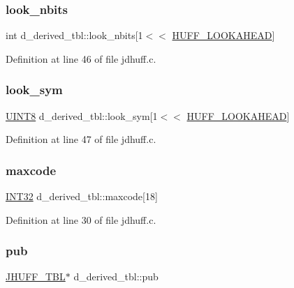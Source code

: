 \subsubsection{\texorpdfstring{look\_nbits}{look\_nbits}}
{\footnotesize\ttfamily int d\+\_\+derived\+\_\+tbl\+::look\+\_\+nbits\mbox{[}1$<$$<$ \mbox{\hyperlink{jdhuff_8c_a51937b71b3fbef28d57cc49f69ec8e7d}{H\+U\+F\+F\+\_\+\+L\+O\+O\+K\+A\+H\+E\+AD}}\mbox{]}}



Definition at line 46 of file jdhuff.\+c.

\mbox{\label{structd__derived__tbl_a526051256461864bc8395d1f6d1a82fd}} 
\subsubsection{\texorpdfstring{look\_sym}{look\_sym}}
{\footnotesize\ttfamily \mbox{\hyperlink{jmorecfg_8h_adfb9a8ea1dd59f151065f763e1e9acd6}{U\+I\+N\+T8}} d\+\_\+derived\+\_\+tbl\+::look\+\_\+sym\mbox{[}1$<$$<$ \mbox{\hyperlink{jdhuff_8c_a51937b71b3fbef28d57cc49f69ec8e7d}{H\+U\+F\+F\+\_\+\+L\+O\+O\+K\+A\+H\+E\+AD}}\mbox{]}}



Definition at line 47 of file jdhuff.\+c.

\mbox{\label{structd__derived__tbl_a4e226d20d913f1c516bd98a930008ad1}} 
\subsubsection{\texorpdfstring{maxcode}{maxcode}}
{\footnotesize\ttfamily \mbox{\hyperlink{jmorecfg_8h_a0cb58e7e6f0bad369840a52e54a56ae0}{I\+N\+T32}} d\+\_\+derived\+\_\+tbl\+::maxcode\mbox{[}18\mbox{]}}



Definition at line 30 of file jdhuff.\+c.

\mbox{\label{structd__derived__tbl_a816f4c07d3173cd1a96ef146acabf6c6}} 
\subsubsection{\texorpdfstring{pub}{pub}}
{\footnotesize\ttfamily \mbox{\hyperlink{structJHUFF__TBL}{J\+H\+U\+F\+F\+\_\+\+T\+BL}}$\ast$ d\+\_\+derived\+\_\+tbl\+::pub}



